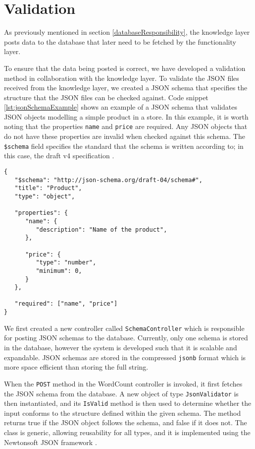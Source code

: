 \section{Validation}

As previously mentioned in section \ref{databaseResponsibility}, the knowledge layer posts data to the database that later need to be fetched by the functionality layer.

To ensure that the data being posted is correct, we have developed a validation method in collaboration with the knowledge layer.
To validate the JSON files received from the knowledge layer, we created a JSON schema that specifies the structure that the JSON files can be checked against. 
Code snippet \ref{lst:jsonSchemaExample} shows an example of a JSON schema that validates JSON objects modelling a simple product in a store. In this example, it is worth noting that the properties \texttt{name} and \texttt{price} are required. Any JSON objects that do not have these properties are invalid when checked against this schema. The \texttt{\$schema} field specifies the standard that the schema is written according to; in this case, the draft v4 specification \cite{tutorialspoint_jsonschema}.

\begin{lstlisting}[language=CSharp, caption={An example of a basic JSON schema.}, label={lst:jsonSchemaExample}]
{
   "$schema": "http://json-schema.org/draft-04/schema#",
   "title": "Product",
   "type": "object",
	
   "properties": {		
      "name": {
         "description": "Name of the product",
      },
		
      "price": {
         "type": "number",
         "minimum": 0,
      }
   },
	
   "required": ["name", "price"]
}
\end{lstlisting}

We first created a new controller called \texttt{SchemaController} which is responsible for posting JSON schemas to the database. 
Currently, only one schema is stored in the database, however the system is developed such that it is scalable and expandable.
JSON schemas are stored in the compressed \texttt{jsonb} format which is more space efficient than storing the full string.

When the \texttt{POST} method in the WordCount controller is invoked, it first fetches the JSON schema from the database.
A new object of type \texttt{JsonValidator} is then instantiated, and its \texttt{IsValid} method is then used to determine whether the input conforms to the structure defined within the given schema. 
The method returns true if the JSON object follows the schema, and false if it does not.
The class is generic, allowing reusability for all types, and it is implemented using the Newtonsoft JSON framework \cite{Json.NET}. 

